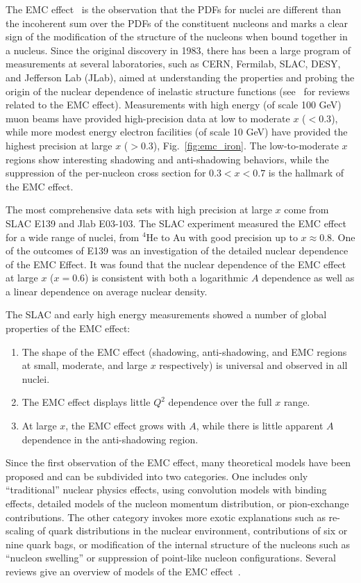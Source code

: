 The EMC effect~\cite{Aubert:1983xm} is the observation that the PDFs for nuclei are different than
the incoherent sum over the PDFs of the constituent nucleons and marks a clear sign of the modification
of the structure of the nucleons when bound together in a nucleus.
Since the original discovery in 1983, there has been a large
program of measurements at several laboratories, such as CERN, Fermilab, SLAC, DESY, and Jefferson Lab (JLab),
aimed at understanding the properties and probing the origin of the nuclear dependence of inelastic
structure functions (see~\cite{Geesaman:1995yd, Malace:2014uea, Hen:2016kwk} for reviews related to the EMC effect).
Measurements with high energy (of scale 100 GeV) muon beams have provided high-precision data at low to
moderate $x$ ($<0.3$), while more modest energy electron facilities (of scale 10 GeV) have provided
the highest precision at large $x$ ($>0.3$), Fig.~\ref{fig:emc_iron}.  The low-to-moderate $x$
regions show interesting shadowing and anti-shadowing behaviors, while the suppression of the
per-nucleon cross section for $0.3<x<0.7$ is the hallmark of the EMC effect.

The most comprehensive data sets with high precision at large $x$ come from SLAC E139 and Jlab E03-103. The SLAC experiment
measured the EMC effect for a wide range of nuclei, from $^4$He to Au with good precision up to
$x\approx0.8$.  One of the outcomes of E139 was an investigation of the detailed nuclear dependence of the EMC
Effect. It was found that the nuclear dependence of the EMC effect at large $x$ ($x=0.6$) is consistent
with both a logarithmic $A$ dependence as well as a linear dependence on average nuclear density.

The SLAC and early high energy measurements showed a number of global properties of the EMC effect:
\begin{enumerate}
 \item{The shape of the EMC effect (shadowing, anti-shadowing, and EMC regions at small, moderate, and
  large $x$ respectively) is universal and observed in all nuclei.}
 \item{The EMC effect displays little $Q^2$ dependence over the full $x$ range.}
 \item{At large $x$, the EMC effect grows with $A$, while there is little apparent $A$ dependence in the
   anti-shadowing region.}
\end{enumerate}

Since the first observation of the EMC effect, many theoretical models have been proposed and can be subdivided into two categories.  One includes only ``traditional'' nuclear physics effects, using convolution models with binding effects, detailed models of the nucleon momentum distribution, or pion-exchange contributions. The other category invokes more exotic explanations such as re-scaling of quark distributions in the nuclear environment, contributions of six or nine
quark bags, or modification of the internal structure of the nucleons such as ``nucleon swelling'' or suppression of point-like nucleon configurations. Several reviews give an overview of models of the EMC effect~\cite{Geesaman:1995yd, Norton:2003cb, Piller:1999wx, Hen:2013oha, Malace:2014uea}.



